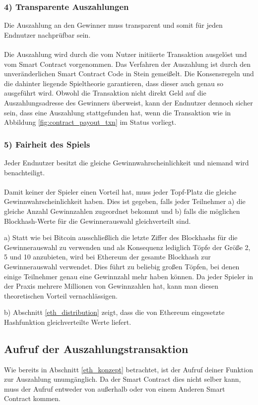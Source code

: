 \subsubsection{4) Transparente Auszahlungen}
Die Auszahlung an den Gewinner muss transparent und somit für jeden Endnutzer nachprüfbar sein.\\\\
Die Auszahlung wird durch die vom Nutzer initiierte  Transaktion ausgelöst und vom Smart Contract vorgenommen. Das Verfahren der Auszahlung ist durch den unveränderlichen Smart Contract Code in Stein gemeißelt. Die Konsensregeln und die dahinter liegende Spieltheorie garantieren, dass dieser auch genau so ausgeführt wird. Obwohl die  Transaktion nicht direkt Geld auf die Auszahlungsadresse des Gewinners überweist, kann der Endnutzer dennoch sicher sein, dass eine Auszahlung stattgefunden hat, wenn die  Transaktion wie in Abbildung \ref{fig:contract_payout_txn} im Status  vorliegt.
\subsubsection{5) Fairheit des Spiels}
Jeder Endnutzer besitzt die gleiche Gewinnwahrscheinlichkeit und niemand wird benachteiligt.\\\\
Damit keiner der Spieler einen Vorteil hat, muss jeder Topf-Platz die gleiche Gewinnwahrscheinlichkeit haben.
Dies ist gegeben, falls jeder Teilnehmer a) die gleiche Anzahl Gewinnzahlen zugeordnet bekommt und b) falls die möglichen Blockhash-Werte für die Gewinnerauswahl gleichverteilt sind.

a) Statt wie bei Bitcoin ausschließlich die letzte Ziffer des Blockhashs für die Gewinnerauswahl zu verwenden und als Konsequenz lediglich Töpfe der Größe 2, 5 und 10 anzubieten, wird bei Ethereum der gesamte Blockhash zur Gewinnerauswahl verwendet. Dies führt zu beliebig großen Töpfen, bei denen einige Teilnehmer genau eine Gewinnzahl mehr haben können. Da jeder Spieler in der Praxis mehrere Millionen von Gewinnzahlen hat, kann man diesen theoretischen Vorteil vernachlässigen.

b) Abschnitt \ref{eth_distribution} zeigt, dass die von Ethereum eingesetzte  Hashfunktion gleichverteilte Werte liefert.


\subsection{Aufruf der Auszahlungstransaktion}
Wie bereits in Abschnitt \ref{eth_konzept} betrachtet, ist der Aufruf deiner Funktion zur Auszahlung unumgänglich. Da der Smart Contract dies nicht selber kann, muss der Aufruf entweder von außerhalb oder von einem Anderen Smart Contract kommen.

